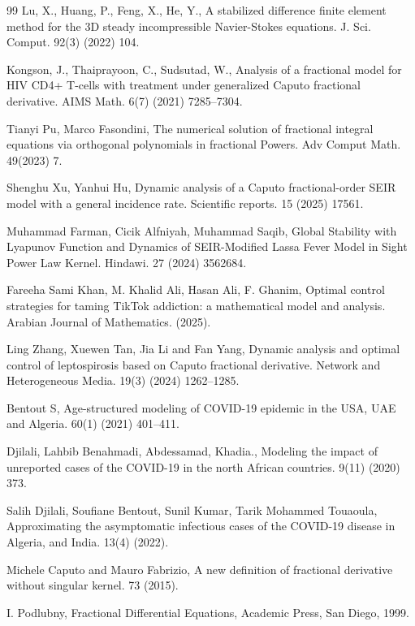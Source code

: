 \documentclass[10pt]{NSP1}
\begin{document}
\begin{thebibliography}{99}
		Lu, X., Huang, P., Feng, X., He, Y., A stabilized difference finite element method for the 3D steady incompressible Navier-Stokes equations. J. Sci. Comput. 92(3) (2022) 104.
		
		Kongson, J., Thaiprayoon, C., Sudsutad, W., Analysis of a fractional model for HIV CD4+ T-cells with treatment under generalized Caputo fractional derivative. AIMS Math. 6(7) (2021) 7285–7304.
		
		Tianyi Pu, Marco Fasondini, The numerical solution of fractional integral equations via orthogonal polynomials in fractional Powers. Adv Comput Math. 49(2023) 7.
		
		Shenghu Xu, Yanhui Hu, Dynamic analysis of a Caputo fractional-order SEIR model with a general incidence rate. Scientific reports. 15 (2025) 17561.
		
		Muhammad Farman, Cicik Alfniyah, Muhammad Saqib, Global Stability with Lyapunov Function and Dynamics of SEIR-Modified Lassa Fever Model in Sight Power Law Kernel. Hindawi. 27 (2024) 3562684.
		
		Fareeha Sami Khan, M. Khalid Ali, Hasan Ali, F. Ghanim, Optimal control strategies for taming TikTok addiction: a mathematical model and analysis. Arabian Journal of Mathematics. (2025).
		
		Ling Zhang, Xuewen Tan, Jia Li and Fan Yang, Dynamic analysis and optimal control of leptospirosis based on Caputo fractional derivative. Network and Heterogeneous Media. 19(3) (2024) 1262–1285.
		
		Bentout S, Age-structured modeling of COVID-19 epidemic in the USA, UAE and Algeria. 60(1) (2021) 401–411.
		
		Djilali, Lahbib Benahmadi, Abdessamad, Khadia., Modeling the impact of unreported cases of the COVID-19 in the north African countries. 9(11) (2020) 373.
		
		Salih Djilali, Soufiane Bentout, Sunil Kumar, Tarik Mohammed Touaoula, Approximating the asymptomatic infectious cases of the COVID-19 disease in Algeria, and India. 13(4) (2022).
		
		Michele Caputo and Mauro Fabrizio, A new definition of fractional derivative without singular kernel. 73 (2015).
		
		I. Podlubny, Fractional Differential Equations, Academic Press, San Diego, 1999.
		

\end{thebibliography}
\end{document}

